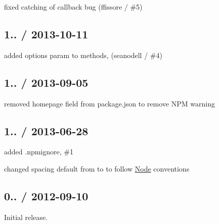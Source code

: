 \begin{DoxyItemize}
\item fixed catching of callback bug (ffissore / \#5)
\end{DoxyItemize}

\subsection*{1.. / 2013-\/10-\/11 }


\begin{DoxyItemize}
\item added {\ttfamily options} param to methods, (seanodell / \#4)
\end{DoxyItemize}

\subsection*{1.. / 2013-\/09-\/05 }


\begin{DoxyItemize}
\item removed {\ttfamily homepage} field from package.\+json to remove N\+PM warning
\end{DoxyItemize}

\subsection*{1.. / 2013-\/06-\/28 }


\begin{DoxyItemize}
\item added {\ttfamily .npmignore}, \#1
\item changed spacing default from {} to {} to follow \mbox{\hyperlink{classNode}{Node}} conventions
\end{DoxyItemize}

\subsection*{0.. / 2012-\/09-\/10 }


\begin{DoxyItemize}
\item Initial release. 
\end{DoxyItemize}